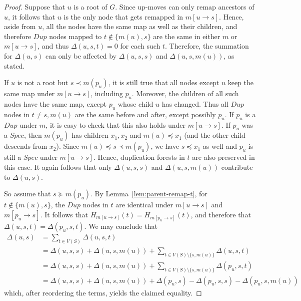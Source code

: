 \documentclass[10pt]{article}
\begin{document}
\begin{proof}
    Suppose that $u$ is a root of $G$.  Since up-moves can only remap ancestors of $u$, it follows that $u$ is the only node that gets remapped in $m[u \rightarrow s]$.  Hence, aside from $u$, all the nodes have the same map as well as their children, and therefore $Dup$ nodes mapped to $t \notin \{m(u), s\}$ are the same in either $m$ or $m[u \rightarrow s]$, and thus $\Delta(u, s, t) = 0$ for each such $t$.  Therefore, the summation for $\Delta(u, s)$ can only be affected by $\Delta(u, s, s)$ and $\Delta(u, s, m(u))$, as stated.
    
    If $u$ is not a root but $s \prec m(p_u)$, it is still true that all nodes except $u$ keep the same map under $m[u \rightarrow s]$, including $p_u$. 
    Moreover, the children of all such nodes have the same map, except $p_u$ whose child $u$ has changed.
    Thus all $Dup$ nodes in $t \neq s, m(u)$ are the same before and after, except possibly $p_u$.
    If $p_u$ is a $Dup$ under $m$, it is easy to check that this also holds under $m[u \rightarrow s]$.  If $p_u$ was a $Spec$, then $m(p_u)$ has children $x_1, x_2$ and $m(u) \preceq x_1$ (and the other child descends from $x_2$).  Since $m(u) \preceq s \prec m(p_u)$, we have $s \preceq x_1$ as well and $p_u$ is still a $Spec$ under $m[u \rightarrow s]$.  Hence, duplication forests in $t$ are also preserved in this case.  It again follows that only $\Delta(u, s, s)$ and $\Delta(u, s, m(u))$ contribute to $\Delta(u, s)$. 
    

    So assume that $s \succeq m(p_u)$.
    By Lemma~\ref{lem:parent-remap-t}, 
    for $t \notin \{m(u), s\}$, the $Dup$ nodes in $t$ are identical under $m[u \rightarrow s]$ and $m[p_u \rightarrow s]$.  
    It follows that $H_{m[u \rightarrow s]}(t) = H_{m[p_u \rightarrow s]}(t)$, and therefore that $\Delta(u, s, t) = \Delta(p_u, s, t)$.
    We may conclude that 
    \begin{align*}
        \Delta(u, s) &= \sum_{t \in V(S)} \Delta(u, s, t) \\
        &= \Delta(u, s, s) + \Delta(u, s, m(u)) + \sum_{t \in V(S) \setminus \{s, m(u)\}} \Delta(u, s, t) \\
        &= \Delta(u, s, s) + \Delta(u, s, m(u)) + \sum_{t \in V(S) \setminus \{s, m(u)\}} \Delta(p_u, s, t) \\
        &= \Delta(u, s, s) + \Delta(u, s, m(u)) + \Delta(p_u, s) - \Delta(p_u, s, s) - \Delta(p_u, s, m(u))
    \end{align*}
    which, after reordering the terms, yields the claimed equality.
\end{proof}
\end{document}
